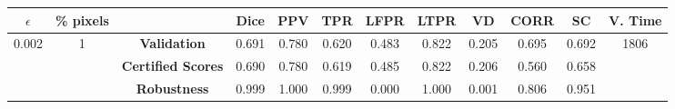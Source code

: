 \begin{longtable}{ c  c | c | c  c  c  c  c  c  c c c}
\toprule \textbf{$\epsilon$} & \textbf{\% pixels} & & \textbf{Dice} & \textbf{PPV} & \textbf{TPR} & \textbf{LFPR} & \textbf{LTPR} & \textbf{VD} & \textbf{CORR} & \textbf{SC} & \textbf{V. Time} \\
\midrule 
\multirow{3}{*}{0.002}  & \multirow{3}{*}{1} &\textbf{Validation} & 0.691 & 0.780 & 0.620 & 0.483 & 0.822 & 0.205 & 0.695 & 0.692 & \multirow{3}{*}{1806} \\
 & & \textbf{Certified Scores} & 0.690 & 0.780 & 0.619 & 0.485 & 0.822 & 0.206 & 0.560 & 0.658 & \\
& & \textbf{Robustness} & 0.999 & 1.000 & 0.999 & 0.000 & 1.000 & 0.001 & 0.806 & 0.951 & \\
\end{longtable}